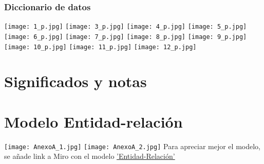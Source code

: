 \documentclass{report}
\begin{document}

\subsection{Diccionario de datos}
\texttt{[image: 1\_p.jpg]}
\newpage
\texttt{[image: 3\_p.jpg]}
\texttt{[image: 4\_p.jpg]}
\newpage
\texttt{[image: 5\_p.jpg]}
\texttt{[image: 6\_p.jpg]}
\newpage
\texttt{[image: 7\_p.jpg]}
\texttt{[image: 8\_p.jpg]}
\newpage
\texttt{[image: 9\_p.jpg]}
\texttt{[image: 10\_p.jpg]}
\newpage
\texttt{[image: 11\_p.jpg]}
\texttt{[image: 12\_p.jpg]}


\chapter{Significados y notas}
\theendnotes


\appendix
\chapter{Modelo Entidad-relación} \label{Entidad_Relacion}
\texttt{[image: AnexoA\_1.jpg]}
\newpage
\texttt{[image: AnexoA\_2.jpg]}
\newline
\newline
Para apreciar mejor el modelo, se añade link a Miro con el modelo \href{https://miro.com/welcomeonboard/cm95QTlodklVRjI5cEtYaUF5UmprejR0OEpEazk3dzRmVkYxZ2hrVFdmVmc2RDl5NVpjeTdwenRYQThsSm9VdHwzMDc0NDU3MzQ4NTY5OTQ5NzE0}{'Entidad-Relación'}
\end{document}
